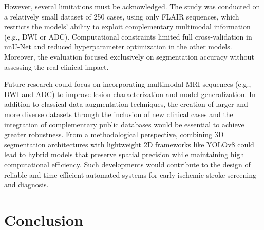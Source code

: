 \documentclass[12pt]{article}
\begin{document}
However, several limitations must be acknowledged. The study was conducted on a relatively small dataset of 250 cases, using only FLAIR sequences, which restricts the models’ ability to exploit complementary multimodal information (e.g., DWI or ADC). Computational constraints limited full cross-validation in nnU-Net and reduced hyperparameter optimization in the other models. Moreover, the evaluation focused exclusively on segmentation accuracy without assessing the real clinical impact.

Future research could focus on incorporating multimodal MRI sequences (e.g., DWI and ADC) to improve lesion characterization and model generalization. In addition to classical data augmentation techniques, the creation of larger and more diverse datasets through the inclusion of new clinical cases and the integration of complementary public databases would be essential to achieve greater robustness. From a methodological perspective, combining 3D segmentation architectures with lightweight 2D frameworks like YOLOv8 could lead to hybrid models that preserve spatial precision while maintaining high computational efficiency. Such developments would contribute to the design of reliable and time-efficient automated systems for early ischemic stroke screening and diagnosis.

\section{Conclusion}\label{sec:conclusion}

\end{document}
